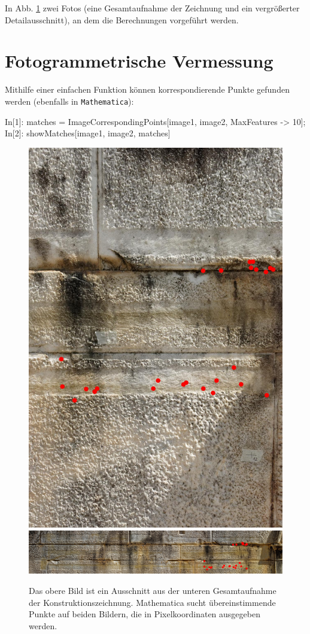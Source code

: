 \documentclass[twocolumn]{bmcart}
\begin{document}
In Abb. \ref{img6} zwei Fotos (eine Gesamtaufnahme der Zeichnung und ein vergrößerter Detailausschnitt), an dem die Berechnungen vorgeführt werden.



\section{Fotogrammetrische Vermessung}

Mithilfe einer einfachen Funktion können korrespondierende Punkte gefunden werden (ebenfalls in \texttt{Mathematica}):
    

	\begin{shaded}
		\begin{mat}
 In[1]:  matches = ImageCorrespondingPoints[image1, image2, MaxFeatures -> 10];
 In[2]:  showMatches[image1, image2, matches]
		\end{mat}
    \end{shaded}
    
    
    
\begin{figure}
	\includegraphics[width=0.5\linewidth]{figures/image1.jpg}
	\includegraphics[width=1.5\linewidth]{figures/image2.jpg}
	\label{img6}
	\caption{Das obere Bild ist ein Ausschnitt aus der unteren Gesamtaufnahme der Konstruktionszeichnung. Mathematica sucht übereinstimmende Punkte auf beiden Bildern, die in Pixelkoordinaten ausgegeben werden.}
\end{figure}
	
\end{document}
